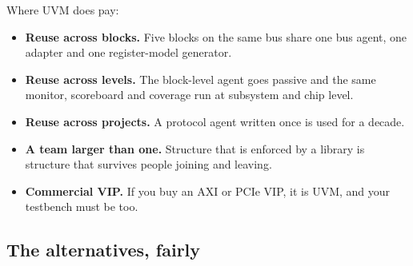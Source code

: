 Where UVM does pay:

\begin{itemize}
  \item \textbf{Reuse across blocks.} Five blocks on the same bus share one
        bus agent, one adapter and one register-model generator.
  \item \textbf{Reuse across levels.} The block-level agent goes passive and
        the same monitor, scoreboard and coverage run at subsystem and chip
        level.
  \item \textbf{Reuse across projects.} A protocol agent written once is used
        for a decade.
  \item \textbf{A team larger than one.} Structure that is enforced by a
        library is structure that survives people joining and leaving.
  \item \textbf{Commercial VIP.} If you buy an AXI or PCIe VIP, it is UVM,
        and your testbench must be too.
\end{itemize}

\subsection{The alternatives, fairly}

